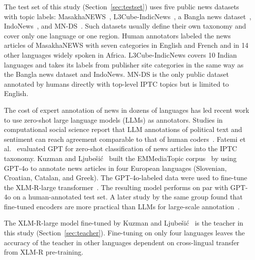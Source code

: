\documentclass{ieeeaccess}
\begin{document}
The test set of this study (Section~\ref{sec:testset}) uses five public news datasets with topic labels: MasakhaNEWS~\cite{adelani2023masakhanews}, L3Cube-IndicNews~\cite{mirashi2023indicnews}, a Bangla news dataset~\cite{hossain2025banglanews}, IndoNews~\cite{indonews2021}, and MN-DS~\cite{petukhova2023mnds}. Such datasets usually define their own taxonomy and cover only one language or one region. Human annotators labeled the news articles of MasakhaNEWS with seven categories in English and French and in 14 other languages widely spoken in Africa. L3Cube-IndicNews covers 10 Indian languages and takes its labels from publisher site categories in the same way as the Bangla news dataset and IndoNews. MN-DS is the only public dataset annotated by humans directly with top-level IPTC topics but is limited to English.

The cost of expert annotation of news in dozens of languages has led recent work to use zero-shot large language models (LLMs) as annotators. Studies in computational social science report that LLM annotations of political text and sentiment can reach agreement comparable to that of human coders~\cite{heseltine2024llmannotation,bojic2025llmvshuman}. Fatemi et al.~\cite{fatemi2023gptiptc} evaluated GPT for zero-shot classification of news articles into the IPTC taxonomy. Kuzman and Ljube\v{s}i\'c~\cite{kuzman2025llm} built the EMMediaTopic corpus~\cite{emmediatopic2025} by using GPT-4o to annotate news articles in four European languages (Slovenian, Croatian, Catalan, and Greek). The GPT-4o-labeled data were used to fine-tune the XLM-R-large transformer~\cite{conneau2020xlmr}. The resulting model performs on par with GPT-4o on a human-annotated test set. A later study by the same group found that fine-tuned encoders are more practical than LLMs for large-scale annotation~\cite{kuzman2025southslavic}.

The XLM-R-large model fine-tuned by Kuzman and Ljube\v{s}i\'c~\cite{kuzman2025llm} is the teacher in this study (Section~\ref{sec:teacher}). Fine-tuning on only four languages leaves the accuracy of the teacher in other languages dependent on cross-lingual transfer from XLM-R pre-training.
\end{document}
